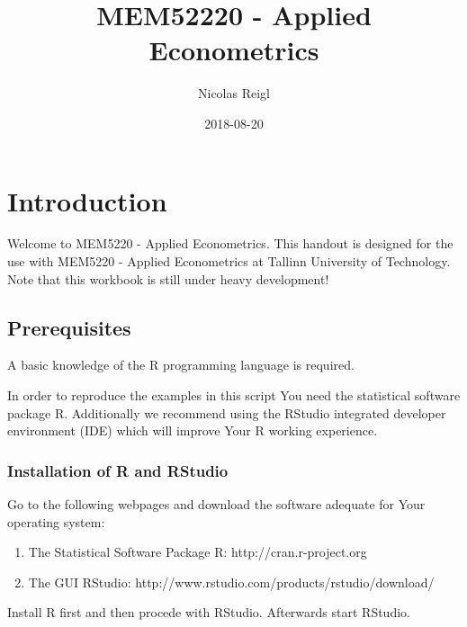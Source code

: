 \documentclass[]{book}
\title{MEM52220 - Applied Econometrics}
\author{Nicolas Reigl}
\date{2018-08-20}
\providecommand{\tightlist}{%
  \setlength{\itemsep}{0pt}\setlength{\parskip}{0pt}}
\begin{document}
\maketitle

{
\setcounter{tocdepth}{1}
\tableofcontents
}
\hypertarget{introduction}{%
\chapter*{Introduction}\label{introduction}}

Welcome to MEM5220 - Applied Econometrics. This handout is designed for
the use with MEM5220 - Applied Econometrics at Tallinn University of
Technology. Note that this workbook is still under heavy development!

\hypertarget{prerequisites}{%
\section*{Prerequisites}\label{prerequisites}}

A basic knowledge of the R \citep{team2013r} programming language is
required.

In order to reproduce the examples in this script You need the
statistical software package R. Additionally we recommend using the
RStudio integrated developer environment (IDE) which will improve Your R
working experience.

\hypertarget{installation-of-r-and-rstudio}{%
\subsection*{Installation of R and
RStudio}\label{installation-of-r-and-rstudio}}

Go to the following webpages and download the software adequate for Your
operating system:

\begin{enumerate}
\def\labelenumi{\arabic{enumi}.}
\tightlist
\item
  The Statistical Software Package R: http://cran.r-project.org 
\item
  The GUI RStudio: http://www.rstudio.com/products/rstudio/download/ 
\end{enumerate}

Install R first and then procede with RStudio. Afterwards start RStudio.
\end{document}
